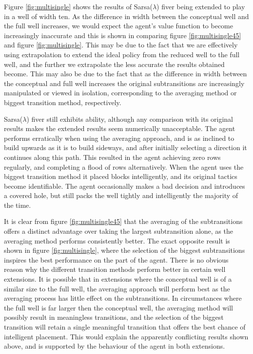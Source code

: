 \documentclass{rucsthesis}
\begin{document}
Figure \ref{fig:multisingle} shows the results of Sarsa($\lambda$) fiver being extended to play in a well of width ten. As the difference in width between the conceptual well and the full well increases, we would expect the agent's value function to become increasingly inaccurate and this is shown in comparing figure \ref{fig:multisingle45} and figure \ref{fig:multisingle}. This may be due to the fact that we are effectively using extrapolation to extend the ideal policy from the reduced well to the full well, and the further we extrapolate the less accurate the results obtained become. This may also be due to the fact that as the difference in width between the conceptual and full well increases the original subtransitions are increasingly manipulated or viewed in isolation, corresponding to the averaging method or biggest transition method, respectively.

Sarsa($\lambda$) fiver still exhibits ability, although any comparison with its original results makes the extended results seem numerically unacceptable.  The agent performs erratically when using the averaging approach, and is as inclined to build upwards as it is to build sideways, and after initially selecting a direction it continues  along this path. This resulted in the agent achieving zero rows regularly, and completing a flood of rows alternatively. When the agent uses the biggest transition method it placed blocks intelligently, and its original tactics become identifiable. The agent occasionally makes a bad decision and introduces a covered hole, but still packs the well tightly and intelligently the majority of the time.

It is clear from figure \ref{fig:multisingle45} that the averaging of the subtransitions offers a distinct advantage over taking the largest subtransition alone, as the averaging method performs consistently better. The exact opposite result is shown in figure \ref{fig:multisingle}, where the selection of the biggest subtransitions inspires the best performance on the part of the agent. There is no obvious reason why the different transition methods perform better in certain well extensions. It is possible that in extensions where the conceptual well is of a similar size to the full well, the averaging approach will perform best as the averaging process has little effect on the subtransitions. In circumstances where the full well is far larger then the conceptual well, the averaging method will possibly result in meaningless transitions, and the selection of the biggest transition will retain a single meaningful transition that offers the best chance of intelligent placement. This would explain the apparently conflicting results shown above, and is supported by the behaviour of the agent in both extensions.
\end{document}

